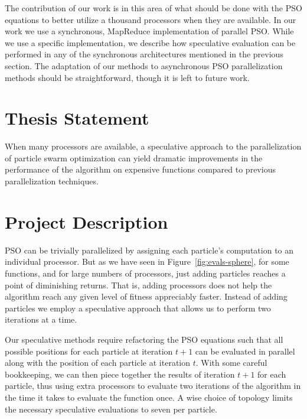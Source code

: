 \documentclass[ms]{byuprop}
\newcommand{\figref}[1]{Figure~\ref{fig:#1}}
\begin{document}
The contribution of our work is in this area of what should be done with the
PSO equations to better utilize a thousand processors when they are available.
In our work we use a synchronous, MapReduce implementation of parallel PSO.
While we use a specific implementation, we describe how speculative evaluation
can be performed in any of the synchronous architectures mentioned in the
previous section.  The adaptation of our methods to asynchronous PSO
parallelization methods should be straightforward, though it is left to future
work.

\section{Thesis Statement}

When many processors are available, a speculative approach to the
parallelization of particle swarm optimization can yield dramatic improvements
in the performance of the algorithm on expensive functions compared to previous
parallelization techniques.


\section{Project Description}

PSO can be trivially parallelized by assigning each particle's computation to
an individual processor.  But as we have seen in \figref{evals-sphere}, for
some functions, and for large numbers of processors, just adding particles
reaches a point of diminishing returns.  That is, adding processors does not
help the algorithm reach any given level of fitness appreciably faster.
Instead of adding particles we employ a speculative approach that allows us to
perform two iterations at a time.

Our speculative methods require refactoring the PSO equations such that all
possible positions for each particle at iteration $t+1$ can be evaluated in
parallel along with the position of each particle at iteration $t$.  With some
careful bookkeeping, we can then piece together the results of iteration $t+1$
for each particle, thus using extra processors to evaluate two iterations of
the algorithm in the time it takes to evaluate the function once.  A wise
choice of topology limits the necessary speculative evaluations to seven per
particle.
\end{document}
